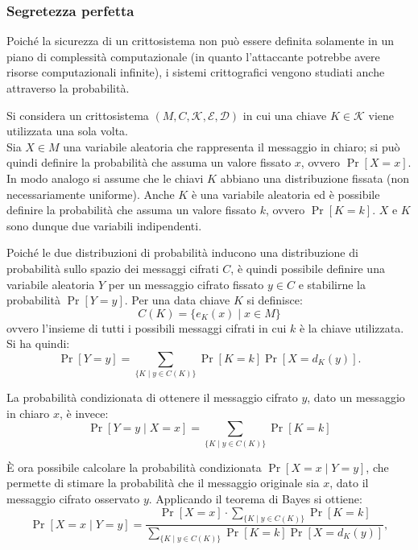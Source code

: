 \subsubsection{Segretezza perfetta}
Poiché la sicurezza di un crittosistema non può essere definita solamente in un piano di complessità computazionale (in quanto l'attaccante potrebbe avere risorse computazionali infinite), i sistemi crittografici vengono studiati anche attraverso la probabilità.

\vspace{1em}\noindent
Si considera un crittosistema $(M,C,\mathcal{K},\mathcal{E},\mathcal{D})$ in cui una chiave $K \in \mathcal{K}$ viene utilizzata una sola volta.\\Sia $X \in M$ una variabile aleatoria che rappresenta il messaggio in chiaro; si può quindi definire la probabilità che assuma un valore fissato $x$, ovvero $\Pr[X = x]$. In modo analogo si assume che le chiavi $K$ abbiano una distribuzione fissata (non necessariamente uniforme). Anche $K$ è una variabile aleatoria ed è possibile definire la probabilità che assuma un valore fissato $k$, ovvero $\Pr[K = k]$. $X$ e $K$ sono dunque due variabili indipendenti.

\vspace{1em}\noindent
Poiché le due distribuzioni di probabilità inducono una distribuzione di probabilità sullo spazio dei messaggi cifrati $C$, è quindi possibile definire una variabile aleatoria $Y$ per un messaggio cifrato fissato $y \in C$ e stabilirne la probabilità $\Pr[Y = y]$. Per una data chiave $K$ si definisce:
\[
    C(K) = \{e_K(x) \mid x \in M\}
\]
ovvero l'insieme di tutti i possibili messaggi cifrati in cui $k$ è la chiave utilizzata. Si ha quindi:
\[
    \Pr[Y = y] = \sum_{\{K \mid y \in C(K)\}} \Pr[K = k]\Pr[X = d_K(y)].
\]

\noindent La probabilità condizionata di ottenere il messaggio cifrato $y$, dato un messaggio in chiaro $x$, è invece:
\[
    \Pr[Y = y \mid X = x] = \sum_{\{K \mid y \in C(K)\}} \Pr[K = k]
\]

\vspace{1em}\noindent È ora possibile calcolare la probabilità condizionata $\Pr[X=x\mid Y=y]$, che permette di stimare la probabilità che il messaggio originale sia $x$, dato il messaggio cifrato osservato $y$. Applicando il teorema di Bayes si ottiene:
\[
    \Pr[X = x \mid Y = y] = \frac{\Pr[X = x] \cdot \sum_{\{K \mid y \in C(K)\}}\Pr[K = k]}{\sum_{\{K \mid y \in C(K)\}} \Pr[K = k]\Pr[X = d_K(y)]},
\]

